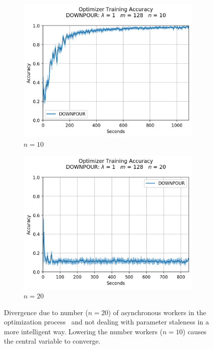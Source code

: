 \begin{figure}[H]
  \centering
  \begin{subfigure}{.49\textwidth}
    \centering
    \includegraphics[width=\linewidth]{resources/images/downpour_10}
    \caption{$n = 10$}
  \end{subfigure}
  \begin{subfigure}{.49\textwidth}
    \centering
    \includegraphics[width=\linewidth]{resources/images/downpour_20}
    \caption{$n = 20$}
  \end{subfigure}
  \caption{Divergence due to number ($n = 20$) of asynchronous workers in the optimization process~\cite{implicitmomentum} and not dealing with parameter staleness in a more intelligent way. Lowering the number workers ($n = 10$) causes the central variable to converge.}
  \label{fig:downpour_convergence}
\end{figure}


